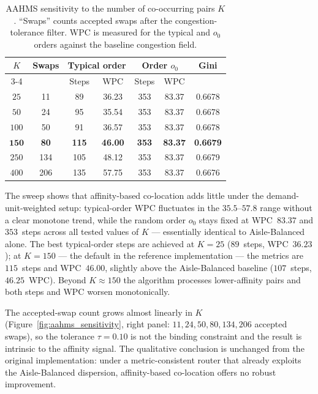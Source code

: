\documentclass[12pt,a4paper]{article}
\begin{document}
\begin{table}[H]
\centering
\caption{AAHMS sensitivity to the number of co-occurring pairs $K$.
  ``Swaps'' counts accepted swaps after the congestion-tolerance filter.
  WPC is measured for the typical and $o_0$ orders against the baseline
  congestion field.}
\label{tab:aahms_k}
\renewcommand{\arraystretch}{1.20}
\begin{tabular}{ccccccc}
\hline
\multirow{2}{*}{$K$} & \multirow{2}{*}{Swaps} & \multicolumn{2}{c}{Typical order} & \multicolumn{2}{c}{Order $o_0$} & \multirow{2}{*}{Gini} \\
\cline{3-4}\cline{5-6}
 & & Steps & WPC & Steps & WPC & \\
\hline
$25$  &  11 &  89 & 36.23 & 353 & 83.37 & 0.6678 \\
$50$  &  24 &  95 & 35.54 & 353 & 83.37 & 0.6678 \\
$100$ &  50 &  91 & 36.57 & 353 & 83.37 & 0.6678 \\
$\mathbf{150}$ & \textbf{80} & \textbf{115} & \textbf{46.00} & \textbf{353} & \textbf{83.37} & \textbf{0.6679} \\
$250$ & 134 & 105 & 48.12 & 353 & 83.37 & 0.6679 \\
$400$ & 206 & 135 & 57.75 & 353 & 83.37 & 0.6676 \\
\hline
\end{tabular}
\end{table}

The sweep shows that affinity-based co-location adds little under the
demand-unit-weighted setup: typical-order WPC fluctuates in the
$35.5$--$57.8$ range without a clear monotone trend, while the random
order $o_0$ stays fixed at WPC~$83.37$ and $353$~steps across all tested
values of $K$ --- essentially identical to Aisle-Balanced alone.
The best typical-order steps are achieved at $K = 25$ ($89$~steps,
WPC~$36.23$); at $K = 150$ --- the default in the reference
implementation --- the metrics are $115$~steps and WPC~$46.00$, slightly
above the Aisle-Balanced baseline ($107$~steps, $46.25$~WPC).
Beyond $K \approx 150$ the algorithm processes lower-affinity pairs and
both steps and WPC worsen monotonically.

The accepted-swap count grows almost linearly in $K$
(Figure~\ref{fig:aahms_sensitivity}, right panel: $11, 24, 50, 80, 134,
206$ accepted swaps), so the tolerance $\tau = 0.10$ is not the binding
constraint and the result is intrinsic to the affinity signal.
The qualitative conclusion is unchanged from the original implementation:
under a metric-consistent router that already exploits the Aisle-Balanced
dispersion, affinity-based co-location offers no robust improvement.
\end{document}
